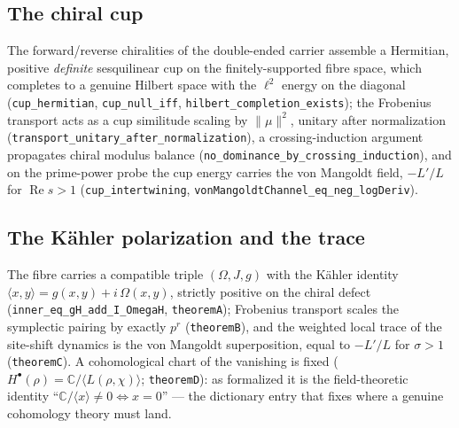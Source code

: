 \documentclass[11pt]{article}
\DeclareMathOperator{\Ree}{Re}
\newcommand{\C}{\mathbb{C}}
\newcommand{\code}[1]{\texttt{#1}}
\begin{document}
\subsection{The chiral cup}\label{sec:cup}
The forward/reverse chiralities of the double-ended carrier assemble a Hermitian, positive
\emph{definite} sesquilinear cup on the finitely-supported fibre space, which completes to a genuine
Hilbert space with the $\ell^2$ energy on the diagonal (\code{cup\_hermitian},
\code{cup\_null\_iff}, \code{hilbert\_completion\_exists}); the Frobenius transport acts as a cup
similitude scaling by $\|\mu\|^2$, unitary after normalization
(\code{transport\_unitary\_after\_normalization}), a crossing-induction argument propagates chiral
modulus balance (\code{no\_dominance\_by\_crossing\_induction}), and on the prime-power probe the
cup energy carries the von Mangoldt field, $-L'/L$ for $\Ree s>1$
(\code{cup\_intertwining}, \code{vonMangoldtChannel\_eq\_neg\_logDeriv}).

\subsection{The K\"ahler polarization and the trace}\label{sec:kahler}
The fibre carries a compatible triple $(\Omega,J,g)$ with the K\"ahler identity
$\langle x,y\rangle=g(x,y)+i\,\Omega(x,y)$, strictly positive on the chiral defect
(\code{inner\_eq\_gH\_add\_I\_OmegaH}, \code{theoremA}); Frobenius transport scales the symplectic
pairing by exactly $p^{r}$ (\code{theoremB}), and the weighted local trace of the site-shift
dynamics is the von Mangoldt superposition, equal to $-L'/L$ for $\sigma>1$ (\code{theoremC}).  A
cohomological chart of the vanishing is fixed ($H^\bullet(\rho)=\C/\langle
L(\rho,\chi)\rangle$; \code{theoremD}): as formalized it is the field-theoretic identity
``$\C/\langle x\rangle\neq0\iff x=0$'' --- the dictionary entry that fixes where a genuine
cohomology theory must land.
\end{document}
